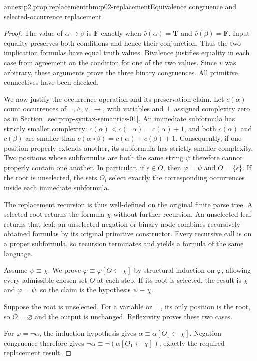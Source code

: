 \begin{annexitem}{annex:p2.prop.replacement}{thm:p02-replacement}{Equivalence congruence and selected-occurrence replacement}
\begin{proof}
The value of \(\alpha\to\beta\) is \(\mathbf F\) exactly when
\(\widehat v(\alpha)=\mathbf T\) and \(\widehat v(\beta)=\mathbf F\).
Input equality preserves both conditions and hence their conjunction.
Thus the two implication formulas have equal truth values.
Bivalence justifies equality in each case from agreement on the condition
for one of the two values.  Since \(v\) was arbitrary, these arguments prove
the three binary congruences.  All primitive connectives have been checked.

We now justify the occurrence operation and its preservation claim.
Let \(c(\alpha)\) count occurrences of \(\neg,\land,\lor,\to\), with
variables and \(\bot\) assigned complexity zero as in
Section~\ref{sec:prop-syntax-semantics-01}.
An immediate subformula has strictly smaller complexity:
\(c(\alpha)<c(\neg\alpha)=c(\alpha)+1\), and both
\(c(\alpha)\) and \(c(\beta)\) are smaller than
\(c(\alpha\circ\beta)=c(\alpha)+c(\beta)+1\).
Consequently, if one position properly extends another, its subformula has
strictly smaller complexity.  Two positions whose subformulas are both the
same string \(\psi\) therefore cannot properly contain one another.
In particular, if \(\epsilon\in O\), then \(\varphi=\psi\) and
\(O=\{\epsilon\}\).  If the root is unselected, the sets \(O_i\) select exactly
the corresponding occurrences inside each immediate subformula.

The replacement recursion is thus well-defined on the original finite parse
tree.  A selected root returns the formula \(\chi\) without further
recursion.  An unselected leaf returns that leaf; an unselected negation or
binary node combines recursively obtained formulas by its original primitive
constructor.  Every recursive call is on a proper subformula, so recursion
terminates and yields a formula of the same language.

Assume \(\psi\equiv\chi\).  We prove
\(\varphi\equiv\varphi[O\leftarrow\chi]\) by structural induction on
\(\varphi\), allowing every admissible chosen set \(O\) at each step.
If its root is selected, the result is \(\chi\) and
\(\varphi=\psi\), so the claim is the hypothesis \(\psi\equiv\chi\).

Suppose the root is unselected.  For a variable or \(\bot\), its only
position is the root, so \(O=\varnothing\) and the output is unchanged.
Reflexivity proves these two cases.

For \(\varphi=\neg\alpha\), the induction hypothesis gives
\(\alpha\equiv\alpha[O_1\leftarrow\chi]\).
Negation congruence therefore gives
\(\neg\alpha\equiv\neg(\alpha[O_1\leftarrow\chi])\), exactly the required
replacement result.


\end{proof}
\end{annexitem}
